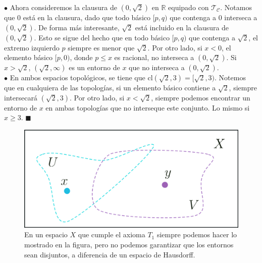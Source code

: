 \documentclass{article}
\begin{document}
$\bullet$ Ahora consideremos la clausura de $(0, \sqrt{2})$ en $\mathbb{R}$ equipado con $\mathcal{T_{C}}$. Notamos que $0$ está en la clausura, dado que todo básico $[p, q)$ que contenga a $0$ interseca a $(0, \sqrt{2})$. De forma más interesante, $\sqrt{2}$ está incluido en la clausura de $(0, \sqrt{2})$. Esto se sigue del hecho que en todo básico $[p, q)$ que contenga a $\sqrt{2}$, el extremo izquierdo $p$ siempre es menor que $\sqrt{2}$. Por otro lado, si $x < 0$, el elemento básico $[p, 0)$, donde $p \leq x$ es racional, no interseca a $(0, \sqrt{2})$. Si $x > \sqrt{2}$, $(\sqrt{2}, \infty)$ es un entorno de $x$ que no interseca a $(0, \sqrt{2})$. \\

$\bullet$ En ambos espacios topológicos, se tiene que $\text{cl}(\sqrt{2}, 3) = [\sqrt{2}, 3)$. Notemos que en cualquiera de las topologías, si un elemento básico contiene a $\sqrt{2}$, siempre intersecará $(\sqrt{2}, 3)$. Por otro lado, si $x < \sqrt{2}$, siempre podemos encontrar un entorno de $x$ en ambas topologías que no interseque este conjunto. Lo mismo si $x \geq 3$.  \hspace*{\fill} $\blacksquare$
\vspace{0.5cm}

\begin{figure}[h]
	\centering \includegraphics[scale=0.15]{e2fig.png}
	\caption{En un espacio $X$ que cumple el axioma $T_{1}$ siempre podemos hacer lo mostrado en la figura, pero no podemos garantizar que los entornos sean disjuntos, a diferencia de un espacio de Hausdorff. }
\end{figure}
\end{document}
